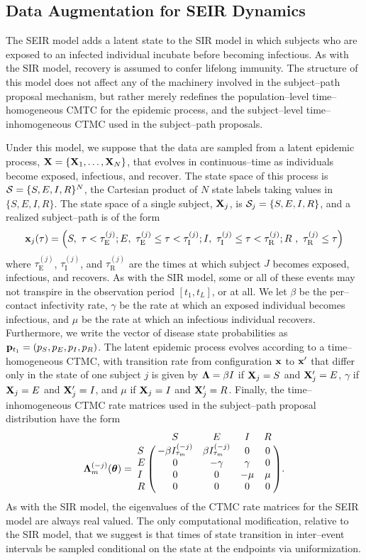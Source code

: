 \subsection{Data Augmentation for SEIR Dynamics}
\label{subsec:bda_seir_model}

The SEIR model adds a latent state to the SIR model in which subjects who are exposed to an infected individual incubate before becoming infectious. As with the SIR model, recovery is assumed to confer lifelong immunity. The structure of this model does not affect any of the machinery involved in the subject--path proposal mechanism, but rather merely redefines the population--level time--homogeneous CMTC for the epidemic process, and the subject--level time--inhomogeneous CTMC used in the subject--path proposals.

Under this model, we suppose that the data are sampled from a latent epidemic process, $ \mathbf{X} = \lbrace \mathbf{X}_1,\dots,\mathbf{X}_N\rbrace $, that evolves in continuous--time as individuals become exposed, infectious, and recover. The state space of this process is $ \mathcal{S} = \lbrace S,E,I,R\rbrace^N $, the Cartesian product of $ N $ state labels taking values in $ \lbrace S,E,I,R\rbrace $. The state space of a single subject, $ \mathbf{X}_j $, is $\mathcal{S}_j = \lbrace S, E, I, R\rbrace $, and a realized subject--path is of the form $$ \mathbf{x}_j(\tau) = \left (S,\ \tau < \tau^{(j)}_{\mathrm{E}};E,\  \tau^{(j)}_{\mathrm{E}} \leq \tau < \tau^{(j)}_{\mathrm{I}};I,\ \tau^{(j)}_{\mathrm{I}} \leq \tau < \tau^{(j)}_{\mathrm{R}};R\ ,\ \tau^{(j)}_{\mathrm{R}} \leq \tau
\right ) $$
where $ \tau^{(j)}_{\mathrm{E}} $, $ \tau^{(j)}_{\mathrm{I}} $, and $ \tau^{(j)}_{\mathrm{R}} $ are the times at which subject $ J $ becomes exposed, infectious, and recovers. As with the SIR model, some or all of these events may not transpire in the observation period $ [t_1,t_L] $, or at all. We let $ \beta $ be the per--contact infectivity rate, $ \gamma $ be the rate at which an exposed individual becomes infectious, and $ \mu $ be the rate at which an infectious individual recovers. Furthermore, we write the vector of disease state probabilities as $ \mathbf{p}_{t_1} = (p_S,p_E,p_I,p_R) $. The latent epidemic process evolves according to a time--homogeneous CTMC, with transition rate from configuration $ \mathbf{x} $ to $ \mathbf{x}^\prime $ that differ only in the state of one subject $ j $ is given by $ \boldsymbol{\Lambda} = \beta I $ if $ \mathbf{X}_j = S $ and $ \mathbf{X}^\prime_j = E$, $ \gamma $ if $ \mathbf{X}_j = E $ and $ \mathbf{X}^\prime_j = I$, and $ \mu $ if $ \mathbf{X}_j = I $ and $ \mathbf{X}^\prime_j = R$. Finally, the time--inhomogeneous CTMC rate matrices used in the subject--path proposal distribution have the form
\begin{equation} \bLambda_m^{(-j)}(\btheta) = \bordermatrix{ & S & E & I & R \cr
	S & -\beta I_{\tau_m}^{(-j)} & \beta I_{\tau_m}^{(-j)} & 0 & 0 \cr 
	E & 0 & -\gamma & \gamma & 0 \cr
	I & 0 & 0 & -\mu & \mu \cr
	R & 0 & 0 & 0 & 0 }.
\end{equation}
As with the SIR model, the eigenvalues of the CTMC rate matrices for the SEIR model are always real valued. The only computational modification, relative to the SIR model, that we suggest is that times of state transition in inter--event intervals be sampled conditional on the state at the endpoints via uniformization.

